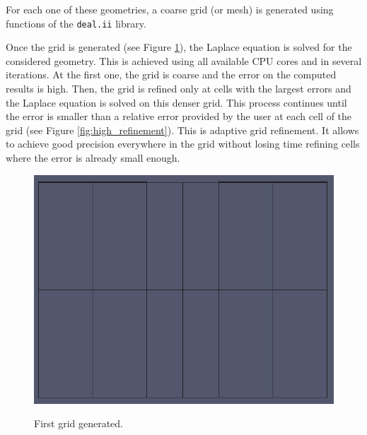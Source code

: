 \documentclass[11pt]{article}
\begin{document}
	For each one of these geometries, a coarse grid (or mesh) is generated using
	functions of the \texttt{deal.ii} library.

	Once the grid is generated (see Figure \ref{fig:no_refinement}), the Laplace equation is solved for the considered
	geometry. This is achieved using all available CPU cores and in several iterations.
	At the first one, the
	grid is coarse and the error on the computed results is high. Then, the grid is
	refined only at cells with the largest errors and the Laplace equation is
	solved on this denser grid. This process continues until
	the error is smaller than a relative error provided by the user at each cell of
	the grid (see Figure \ref{fig:high_refinement}). This is adaptive grid refinement. It allows to achieve good precision
	everywhere in the grid without losing time refining cells where the error is already small
	enough.

	\begin{figure}[H]
	  \center
	  \includegraphics[scale=0.4]{images/grid_refinement/no_refinement.png}
	  \label{fig:no_refinement}
	  \caption{First grid generated.}
	\end{figure}
\end{document}
